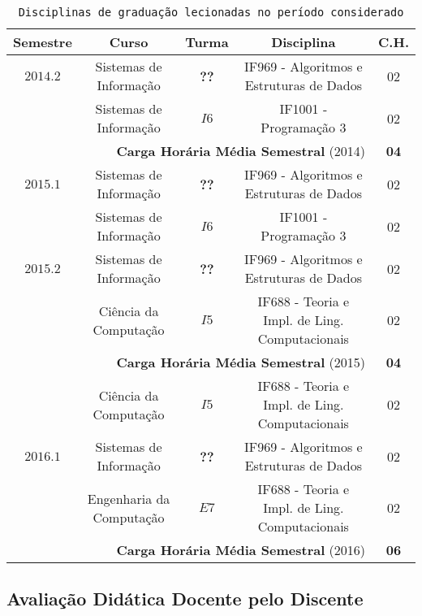\documentclass[a4paper,oneside,10pt]{article}
\newcommand{\otoprule}{\midrule[\heavyrulewidth]}
\begin{document}
\begin{table}[!htpb]
\centering \small
\caption{\texttt{Disciplinas de gradua\c{c}\~{a}o lecionadas no per\'{\i}odo considerado} }
\begin{tabular}{ccccc}
\toprule
\textbf{Semestre} & \textbf{Curso} & \textbf{Turma} & \textbf{Disciplina} & \textbf{C.H.} \\
\otoprule
$2014.2$ & Sistemas de Informação & \textbf{??} & IF969 - Algoritmos e Estruturas de Dados & 02\\
  & Sistemas de Informação & $I6$ & IF1001 - Programação 3 & 02\\
\cmidrule{1-5}
\multicolumn{4}{r}{\textbf{Carga Hor\'{a}ria M\'{e}dia Semestral} (2014)} & \textbf{04} \\
\otoprule
$2015.1$ & Sistemas de Informação & \textbf{??} & IF969 - Algoritmos e Estruturas de Dados & 02\\
  & Sistemas de Informação & $I6$ & IF1001 - Programação 3 & 02\\
\cmidrule{1-5}
$2015.2$ & Sistemas de Informação & \textbf{??} & IF969 - Algoritmos e Estruturas de Dados & 02\\
  & Ciência da Computação & $I5$ & IF688 - Teoria e Impl. de Ling. Computacionais & 02\\
\cmidrule{1-5}
\multicolumn{4}{r}{\textbf{Carga Hor\'{a}ria M\'{e}dia Semestral} (2015)} & \textbf{04} \\
\otoprule
  & Ciência da Computação & $I5$ & IF688 - Teoria e Impl. de Ling. Computacionais & 02\\
$2016.1$ & Sistemas de Informação & \textbf{??} & IF969 - Algoritmos e Estruturas de Dados & 02\\
  & Engenharia da Computação & $E7$ & IF688 - Teoria e Impl. de Ling. Computacionais & 02\\
\cmidrule{1-5}
\multicolumn{4}{r}{\textbf{Carga Hor\'{a}ria M\'{e}dia Semestral} (2016)} & \textbf{06} \\
\bottomrule
\end{tabular}
\label{Tab:Disc_Grad}
\end{table}

\subsection{Avaliação Didática Docente pelo Discente}
\vspace{0.3cm}
\end{document}
